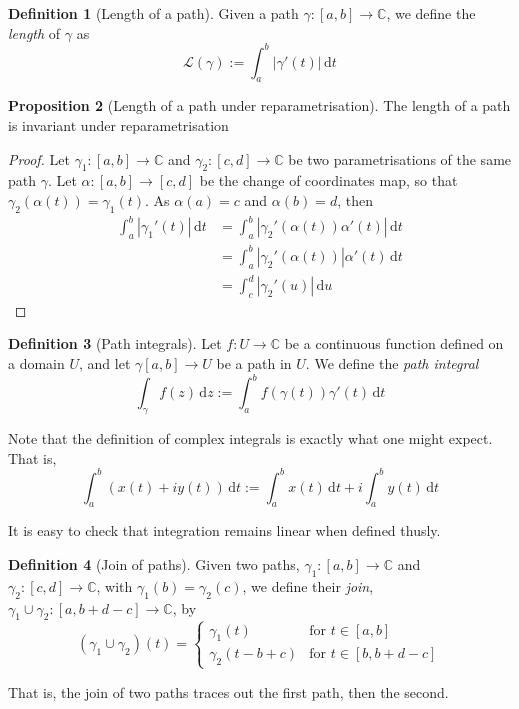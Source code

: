 \documentclass[10pt,fleqn]{article}
\newcommand{\diff}{\,\mathrm{d}}
\newcommand{\comps}{\mathbb{C}}
\theoremstyle{definition} \newtheorem{defn}{Definition}[section]
\theoremstyle{plain}      \newtheorem{thm}[defn]{Theorem}
\theoremstyle{definition} \newtheorem{prop}[defn]{Proposition}
\theoremstyle{plain}      \newtheorem{lem}[defn]{Lemma}
\theoremstyle{definition} \newtheorem{cor}[defn]{Corollary}
\theoremstyle{definition} \newtheorem{ex}[defn]{Example}
\theoremstyle{definition} \newtheorem{rem}[defn]{Remark}
\begin{document}
\begin{defn}[Length of a path]
    Given a path $\gamma:[a,b]\to\comps$, we define the \emph{length} of $\gamma$ as
    \begin{equation}
        \mathcal{L}(\gamma):=
        \int_a^b|\gamma'(t)|\diff t
    \end{equation}
\end{defn}

\begin{prop}[Length of a path under reparametrisation]
    The length of a path is invariant under reparametrisation
\end{prop}

\begin{proof}
    Let $\gamma_1:[a,b]\to\comps$ and $\gamma_2:[c,d]\to\comps$ be two parametrisations of the same path $\gamma$.
    Let $\alpha:[a,b]\to[c,d]$ be the change of coordinates map, so that $\gamma_2(\alpha(t))=\gamma_1(t)$.
    As $\alpha(a)=c$ and $\alpha(b)=d$, then
    \begin{align*}
        \int_a^b|\gamma_1'(t)|\diff t
        &=
        \int_a^b|\gamma_2'(\alpha(t))\alpha'(t)|\diff t\\
        &=
        \int_a^b|\gamma_2'(\alpha(t))|\alpha'(t)\diff t\\
        &=
        \int_c^d|\gamma_2'(u)|\diff u
    \end{align*}
\end{proof}

\begin{defn}[Path integrals]
    Let $f:U\to\comps$ be a continuous function defined on a domain $U$, and let $\gamma[a,b]\to U$ be a path in $U$.
    We define the \emph{path integral}
    \begin{equation}
        \int_{\gamma} f(z)\diff z:=
        \int_a^b f(\gamma(t))\gamma'(t)\diff t
    \end{equation}

    Note that the definition of complex integrals is exactly what one might expect.
    That is,
    \[
        \int_a^b (x(t)+iy(t))\diff t:=
        \int_a^b x(t)\diff t + i\int_a^b y(t)\diff t
    \]

    It is easy to check that integration remains linear when defined thusly.
\end{defn}

\begin{defn}[Join of paths]
    Given two paths, $\gamma_1:[a,b]\to\comps$ and $\gamma_2:[c,d]\to\comps$, with $\gamma_1(b)=\gamma_2(c)$, we define their \emph{join}, $\gamma_1\cup\gamma_2:[a,b+d-c]\to\comps$, by
    \begin{equation}
        (\gamma_1\cup\gamma_2)(t)=
        \left\{
        \begin{array}{lr}
            \gamma_1(t) & \text{for }t\in[a,b]\\
            \gamma_2(t-b+c) & \text{for }t\in[b,b+d-c]
        \end{array}
        \right.
    \end{equation}

    That is, the join of two paths traces out the first path, then the second.
\end{defn}
\end{document}
